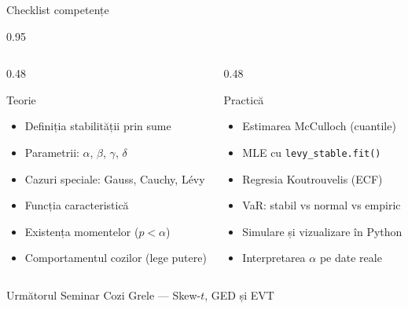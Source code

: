 \documentclass[9pt, aspectratio=169, t]{beamer}
\begin{document}
\begin{frame}{Checklist competențe}
    \begin{cminipage}{0.95\textwidth}
\begin{columns}[T]
\begin{column}{0.48\textwidth}
\begin{block}{Teorie}
\begin{itemize}\setlength{\itemsep}{0pt}
    \item[$\square$] Definiția stabilității prin sume
    \item[$\square$] Parametrii: $\alpha$, $\beta$, $\gamma$, $\delta$
    \item[$\square$] Cazuri speciale: Gauss, Cauchy, L\'{e}vy
    \item[$\square$] Funcția caracteristică
    \item[$\square$] Existența momentelor ($p < \alpha$)
    \item[$\square$] Comportamentul cozilor (lege putere)
\end{itemize}
\end{block}
\end{column}
\begin{column}{0.48\textwidth}
\begin{block}{Practică}
\begin{itemize}\setlength{\itemsep}{0pt}
    \item[$\square$] Estimarea McCulloch (cuantile)
    \item[$\square$] MLE cu \texttt{levy\_stable.fit()}
    \item[$\square$] Regresia Koutrouvelis (ECF)
    \item[$\square$] VaR: stabil vs normal vs empiric
    \item[$\square$] Simulare și vizualizare în Python
    \item[$\square$] Interpretarea $\alpha$ pe date reale
\end{itemize}
\end{block}
\end{column}
\end{columns}

    \vspace{0.3cm}
    \begin{block}{Următorul Seminar}
        Cozi Grele --- Skew-$t$, GED și EVT
    \end{block}
    \end{cminipage}
\end{frame}

\end{document}

